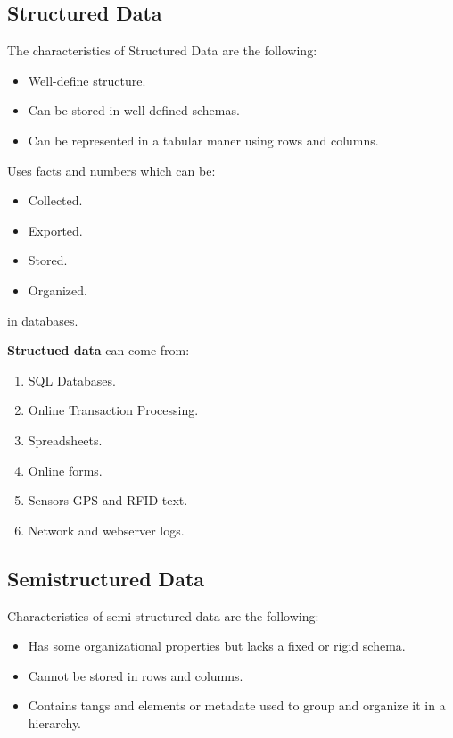 \documentclass[../../ibm_data_analysis.tex]{subfiles}
\begin{document}
    \subsection{Structured Data}

    The characteristics of Structured Data are the following:
    \begin{itemize}
        \item Well-define structure.
        \item Can be stored in well-defined schemas.
        \item Can be represented in a tabular maner using rows and columns.
    \end{itemize}

    Uses facts and numbers which can be:
    \begin{itemize}
        \item Collected.
        \item Exported.
        \item Stored.
        \item Organized.
    \end{itemize}
    in databases.

    \begin{exa}
        \textbf{Structued data} can come from:
        \begin{enumerate}
            \item SQL Databases.
            \item Online Transaction Processing.
            \item Spreadsheets.
            \item Online forms.
            \item Sensors GPS and RFID text.
            \item Network and webserver logs.
        \end{enumerate}
    \end{exa}

    \subsection{Semistructured Data}

    Characteristics of semi-structured data are the following:
    \begin{itemize}
        \item Has some organizational properties but lacks a fixed or rigid schema.
        \item Cannot be stored in rows and columns.
        \item Contains tangs and elements or metadate used to group and organize it in a hierarchy.
    \end{itemize}
\end{document}
